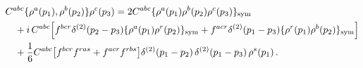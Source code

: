 \begin{align}\label{eq:symr21}
&C^{abc}\{\rho^{a}(p_{1}),\rho^{b}(p_{2})\}\rho^{c}(p_{3})=2C^{abc}\{\rho^{a}(p_{1})\rho^{b}(p_{2})\rho^{c}(p_{3})\}_{\rm sym}\notag\\
&\quad +i\, C^{abc}\Big[f^{bcr}\delta^{(2)}(p_{2}-p_{3})\{\rho^{a}(p_{1})\rho^{r}(p_{2})\}_{\rm sym} +f^{acr}\delta^{(2)}(p_{1}-p_{3})\{\rho^{r}(p_{1})\rho^{b}(p_{2})\}_{\rm sym}\Big]\notag\\
&\quad +\frac{1}{6}C^{abc}\big[f^{bcr}f^{ras} +f^{acr}f^{rbs}\big]\delta^{(2)}(p_{1}-p_{2})\, \delta^{(2)}(p_{1}-p_{3})\, \rho^{s}(p_{1})\,.
\end{align}
